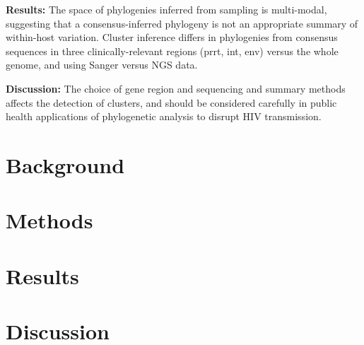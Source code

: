 \documentclass[letterpaper]{article}
\begin{document}
\textbf{Results:} The space of phylogenies inferred from sampling is multi-modal, suggesting that a consensus-inferred phylogeny is not an appropriate summary of within-host variation. Cluster inference differs in phylogenies from consensus sequences in three clinically-relevant regions (prrt, int, env) versus the whole genome, and using Sanger versus NGS data.

\textbf{Discussion:} The choice of gene region and sequencing and summary methods affects the detection of clusters, and should be considered carefully in public health applications of phylogenetic analysis to disrupt HIV transmission.

\section*{Background}

\section*{Methods}

\section*{Results}

\section*{Discussion}


\end{document}
